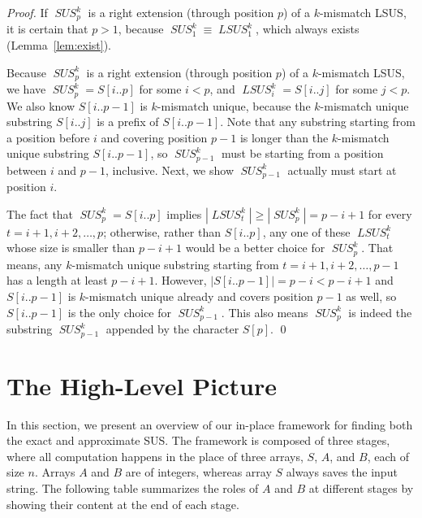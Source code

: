 \documentclass[11pt]{llncs}
\DeclareMathOperator{\sus}{\mathit{SUS}}
\DeclareMathOperator{\lsus}{\mathit{LSUS}}
\begin{document}
\begin{proof}
  If $\sus_p^k$ is a right extension (through position $p$) of a
  $k$-mismatch LSUS, it is certain
  that $p>1$, because $\sus_1^k \equiv \lsus_1^k$, which always exists
  (Lemma~\ref{lem:exist}).

  Because $\sus_p^k$ is a right extension (through position $p$) of a
  $k$-mismatch LSUS, we have
  $\sus_p^k=S[i.. p]$ for some $i < p$, and $\lsus_i^k = S[i.. j]$
  for some $j<p$.  We also know $S[i.. p-1]$ is $k$-mismatch unique, because
  the $k$-mismatch unique substring $S[i.. j]$ is a prefix of $S[i.. p-1]$.
  Note that any substring starting from a position before $i$ and
  covering position $p-1$ is longer than the $k$-mismatch unique substring
  $S[i.. p-1]$, so $\sus_{p-1}^k$ must be starting from a position
  between $i$ and $p-1$, inclusive.
Next, we show $\sus_{p-1}^k$ actually must start at position $i$.  

  The fact that $\sus_p^k = S[i .. p]$ implies $|\lsus_t^k| \geq
  |\sus_p^k| = p-i+1$ for every $t=i+1, i+2, \ldots, p$; otherwise,
  rather than $S[i .. p]$, any one of these $\lsus_t^k$ whose size is
  smaller than $p-i+1$ would be a better choice for $\sus_p^k$. That
  means, any $k$-mismatch unique substring starting from $t=i+1, i+2,
  \ldots, p-1$ has a length at least $p-i+1$. However, $|S[i .. p-1]|
  = p-i < p-i+1$ and $S[i ..  p-1]$ is $k$-mismatch unique already and
  covers position $p-1$ as well, so $S[i .. p-1]$ is the only choice
  for $\sus_{p-1}^k$. This also means $\sus_p^k$ is indeed the
  substring $\sus_{p-1}^k$ appended by the character $S[p]$.  \qed
\end{proof}






\section{The High-Level Picture}
\label{sec:highlevel}
In this section, we present an overview of our in-place framework for
finding both the exact and approximate SUS. The framework is composed
of three stages, where all computation happens in the place of three
arrays, $S$, $A$, and $B$, each of size $n$. Arrays $A$ and $B$ are of
integers, whereas array $S$ always saves the
input string. 
The following table summarizes the roles of 
$A$ and $B$ at different stages by showing their content at the end of
each stage.
\end{document}
